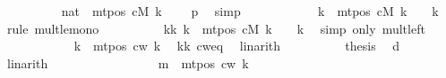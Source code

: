 \begin{isabellebody}
\ \ \ \ \ \ \ \ \isamarkupfalse%
\ {\isachardoublequoteopen}{\isacharparenleft}{\kern0pt}{}{\isacharcolon}{\kern0pt}{\isacharcolon}{\kern0pt}nat{\isacharparenright}{\kern0pt}\ {\isasymle}\ mt{\isacharunderscore}{\kern0pt}pos\ cM\ k\ {\isacharminus}{\kern0pt}\ {}{\isachardoublequoteclose}\ \isamarkupfalse%
\ p{}\ \isamarkupfalse%
\ simp\isanewline
\ \ \ \ \ \ \ \ \isamarkupfalse%
\ {\isachardoublequoteopen}{}\ {\isacharasterisk}{\kern0pt}\ {\isacharquery}{\kern0pt}k\ {\isasymle}\ {\isacharparenleft}{\kern0pt}mt{\isacharunderscore}{\kern0pt}pos\ cM\ k\ {\isacharminus}{\kern0pt}\ {}{\isacharparenright}{\kern0pt}\ {\isacharasterisk}{\kern0pt}\ {\isacharquery}{\kern0pt}k{\isachardoublequoteclose}\ \isamarkupfalse%
\ {\isacharparenleft}{\kern0pt}rule\ mult{\isacharunderscore}{\kern0pt}le{\isacharunderscore}{\kern0pt}mono{}{\isacharparenright}{\kern0pt}\isanewline
\ \ \ \ \ \ \ \ \isamarkupfalse%
\ kk{\isacharcolon}{\kern0pt}\ {\isachardoublequoteopen}{\isacharquery}{\kern0pt}k\ {\isasymle}\ {\isacharparenleft}{\kern0pt}mt{\isacharunderscore}{\kern0pt}pos\ cM\ k\ {\isacharminus}{\kern0pt}\ {}{\isacharparenright}{\kern0pt}\ {\isacharasterisk}{\kern0pt}\ {\isacharquery}{\kern0pt}k{\isachardoublequoteclose}\ \isamarkupfalse%
\ {\isacharparenleft}{\kern0pt}simp\ only{\isacharcolon}{\kern0pt}\ mult{\isacharunderscore}{\kern0pt}{}{\isacharunderscore}{\kern0pt}left{\isacharparenright}{\kern0pt}\isanewline
\ \ \ \ \ \ \ \ \isamarkupfalse%
\ {\isachardoublequoteopen}{}\ {\isacharasterisk}{\kern0pt}\ {\isacharquery}{\kern0pt}k\ {\isasymle}\ mt{\isacharunderscore}{\kern0pt}pos\ c{\isacharunderscore}{\kern0pt}w\ k{\isachardoublequoteclose}\ \isamarkupfalse%
\ kk\ cw{\isacharunderscore}{\kern0pt}eq\ \isamarkupfalse%
\ linarith\isanewline
\ \ \ \ \ \ \ \ \isamarkupfalse%
\ {\isacharquery}{\kern0pt}thesis\ \isamarkupfalse%
\ d{}\ \isamarkupfalse%
\ linarith\isanewline
\ \ \ \ \ \ \isamarkupfalse%
\isanewline
\ \ \ \ \isamarkupfalse%
\isanewline
\ \ \ \ \isamarkupfalse%
\ {\isachardoublequoteopen}m\ {\isacharless}{\kern0pt}\ mt{\isacharunderscore}{\kern0pt}pos\ c{\isacharunderscore}{\kern0pt}w\ k{\isachardoublequoteclose}\ \isamarkupfalse%

\end{isabellebody}
